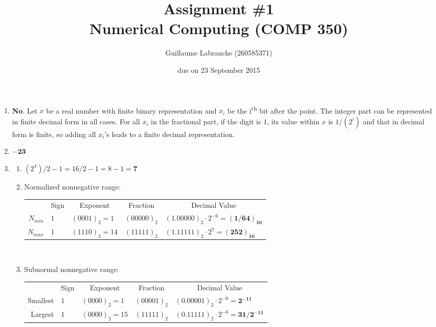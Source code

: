 \documentclass{article}
\author{Guillaume Labranche (260585371)}
\title{Assignment \#1\\Numerical Computing (COMP 350)}
\date{due on 23 September 2015}
\begin{document}
\maketitle
 
\begin{enumerate}%
 \item \textbf{No}. Let $x$ be a real number with finite binary representation and $x_i$ be the i\textsuperscript{th} bit after the point. The integer part can be represented in finite decimal form in all cases. For all $x_i$ in the fractional part, if the digit is $1$, its value within $x$ is $1/(2^i)$ and that in decimal form is finite,  so adding all $x_i$'s leads to a finite decimal representation.
 \item $\boldsymbol{-23}$
 \item 
   \begin{enumerate}
     \item $(2^4)/2-1=16/2-1=8-1=\boldsymbol{7}$
     \item Normalized nonnegative range:
     
\begin{tabular}{ r|l|l|l|l| }
\multicolumn{1}{r}{}
 & \multicolumn{1}{c}{Sign}
 & \multicolumn{1}{c}{Exponent}
 & \multicolumn{1}{c}{Fraction}
 & \multicolumn{1}{c}{Decimal Value} \\
\cline{2-5}
$N_{min}$ & $1$ & $(0001)_2=1$ & $(00000)_2$ & $(1.00000)_2 \cdot 2^{-6}=\boldsymbol{(1/64)_{10}}$
 \\
\cline{2-5}
$N_{max}$ & $1$ & $(1110)_2=14$ & $(11111)_2$ & $(1.11111)_2 \cdot 2^7=\boldsymbol{(252)_{10}}$
 \\
\cline{2-5}
\end{tabular}\\

	\item Subnormal nonnegative range:
	
\begin{tabular}{ r|l|l|l|l| }
\multicolumn{1}{r}{}
 & \multicolumn{1}{c}{Sign}
 & \multicolumn{1}{c}{Exponent}
 & \multicolumn{1}{c}{Fraction}
 & \multicolumn{1}{c}{Decimal Value} \\
\cline{2-5}
Smallest & $1$ & $(0000)_2=1$ & $(00001)_2$ & $(0.00001)_2 \cdot 2^{-6}=\boldsymbol{2^{-11}}$
 \\
\cline{2-5}
Largest & $1$ & $(0000)_2=15$ & $(11111)_2$ & $(0.11111)_2 \cdot 2^{-6}=\boldsymbol{31/2^{-11}}$
 \\
\cline{2-5}
\end{tabular}
	

\end{enumerate}
\end{enumerate}
\end{document}
